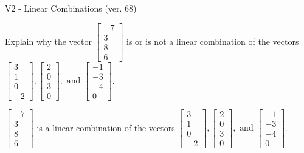 \begin{exercise}
  \begin{exerciseTitle}V2 - Linear Combinations (ver. 68)\end{exerciseTitle}
  \begin{exerciseStatement}
    Explain why the vector \(\left[\begin{array}{c}
-7 \\
3 \\
8 \\
6
\end{array}\right]\)  is or is not a linear 
	combination of the vectors \(\left[\begin{array}{c}
3 \\
1 \\
0 \\
-2
\end{array}\right] , \left[\begin{array}{c}
2 \\
0 \\
3 \\
0
\end{array}\right] , \text{ and } \left[\begin{array}{c}
-1 \\
-3 \\
-4 \\
0
\end{array}\right]\).
	


  \end{exerciseStatement}
  \begin{exerciseAnswer}
   \(\left[\begin{array}{c}
-7 \\
3 \\
8 \\
6
\end{array}\right]\) 
  	 is  
	a linear combination of the vectors \(\left[\begin{array}{c}
3 \\
1 \\
0 \\
-2
\end{array}\right] , \left[\begin{array}{c}
2 \\
0 \\
3 \\
0
\end{array}\right] , \text{ and } \left[\begin{array}{c}
-1 \\
-3 \\
-4 \\
0
\end{array}\right]\).

	
  


  \end{exerciseAnswer}
\end{exercise}